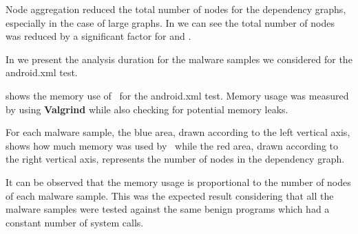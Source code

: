 
Node aggregation reduced the total number of nodes for the dependency graphs, especially in the case of large graphs. In  we can see the total number of nodes was reduced by a significant factor for  and .

In  we present the analysis duration for the malware samples we considered for the android.xml test.


 shows the memory use of \project\ for the android.xml test. Memory usage was measured by using \textbf{Valgrind} while also checking for potential memory leaks. 

For each malware sample, the blue area, drawn according to the left vertical axis, shows how much memory was used by \project\ while the red area, drawn according to the right vertical axis, represents the number of nodes in the dependency graph.

It can be observed that the memory usage is proportional to the number of nodes of each malware sample. This was the expected result considering that all the malware samples were tested against the same benign programs which had a constant number of system calls.

